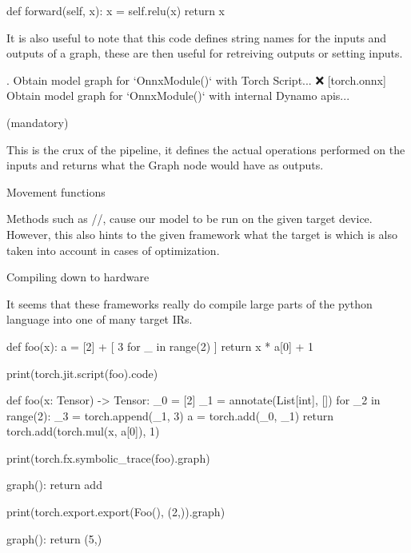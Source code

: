 def forward(self, x):
  x = self.relu(x)
  return x
\endtt

It is also useful to note that this code defines
string names for the inputs and outputs of a graph,
these are then useful for retreiving outputs or setting inputs.

.
 Obtain model graph for `OnnxModule()` with Torch Script... ❌
[torch.onnx] Obtain model graph for `OnnxModule()` with internal Dynamo apis...
\endtt

\secc {}

\secc {} (mandatory)

This is the crux of the pipeline,
it defines the actual operations performed on
the inputs and returns what the Graph node would have
as outputs.

\secc Movement functions

Methods such as //,
cause our model to be run on the given target device.
However, this also hints to the given framework
what the target is which is also taken into account
in cases of optimization.

\sec Compiling down to hardware

It seems that these frameworks really do
compile large parts of the python language
into one of many target IRs.

\begtt{}
def foo(x):
  a = [2] + [ 3 for _ in range(2) ]
  return x * a[0] + 1
\endtt

\begtt
print(torch.jit.script(foo).code)

def foo(x: Tensor) -> Tensor:
  _0 = [2]
  _1 = annotate(List[int], [])
  for _2 in range(2):
    _3 = torch.append(_1, 3)
  a = torch.add(_0, _1)
  return torch.add(torch.mul(x, a[0]), 1)
\endtt

\begtt
print(torch.fx.symbolic_trace(foo).graph)

graph():
  return add
\endtt

\begtt
print(torch.export.export(Foo(), (2,)).graph)

graph():
  return (5,)
\endtt
{}

